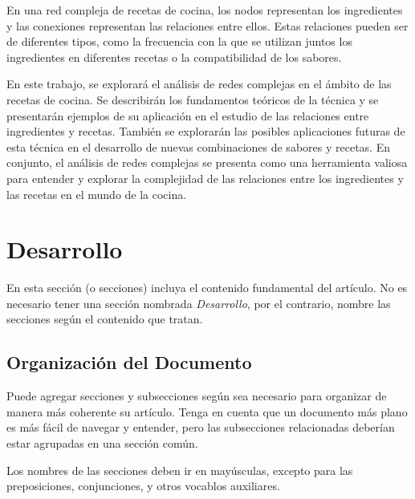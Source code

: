 \documentclass[a4paper]{article}
\begin{document}
En una red compleja de recetas de cocina, los nodos representan los ingredientes
y las conexiones representan las relaciones entre ellos. Estas relaciones pueden
ser de diferentes tipos, como la frecuencia con la que se utilizan juntos los
ingredientes en diferentes recetas o la compatibilidad de los sabores.

En este trabajo, se explorará el análisis de redes complejas en el ámbito de las
recetas de cocina. Se describirán los fundamentos teóricos de la técnica y se
presentarán ejemplos de su aplicación en el estudio de las relaciones entre
ingredientes y recetas. También se explorarán las posibles aplicaciones futuras
de esta técnica en el desarrollo de nuevas combinaciones de sabores y recetas.
En conjunto, el análisis de redes complejas se presenta como una herramienta
valiosa para entender y explorar la complejidad de las relaciones entre los
ingredientes y las recetas en el mundo de la cocina.




\section{Desarrollo}\label{sec:dev}
  En esta sección (o secciones) incluya el contenido fundamental del artículo.
  No es necesario tener una sección nombrada \emph{Desarrollo}, por el contrario,
  nombre las secciones según el contenido que tratan.

	\subsection{Organización del Documento}\label{sub:results}
		Puede agregar secciones y subsecciones según sea necesario para organizar
		de manera más coherente su artículo. Tenga en cuenta que un documento más
		plano es más fácil de navegar y entender, pero las subsecciones relacionadas
		deberían estar agrupadas en una sección común.

		Los nombres de las secciones deben ir en mayúsculas, excepto para las
		preposiciones, conjunciones, y otros vocablos auxiliares.
\end{document}
